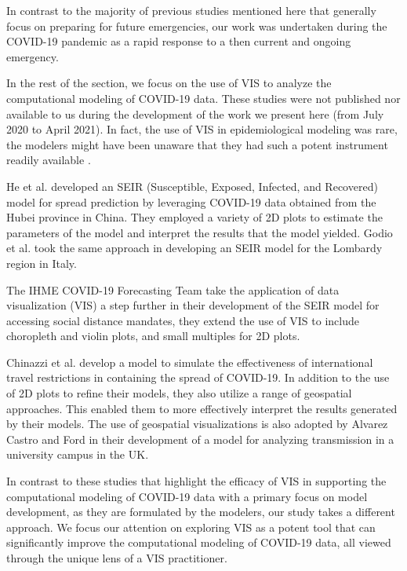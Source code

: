 In contrast to the majority of previous studies mentioned here that generally focus on preparing for future emergencies, our work was undertaken during the COVID-19 pandemic as a rapid response to a then current and ongoing emergency.

In the rest of the section, we focus on the use of \ac{VIS} to analyze the computational modeling of COVID-19 data.
These studies were not published nor available to us during the development of the work we present here (from July 2020 to April 2021).
In fact, the use of VIS in epidemiological modeling was rare, the modelers might have been unaware that they had such a potent instrument readily available \cite{chen2022RAMPVIS}.

He et al. \cite{he2020SEIR} developed an SEIR (Susceptible, Exposed, Infected, and Recovered) model for spread prediction by leveraging COVID-19 data obtained from the Hubei province in China.
They employed a variety of 2D plots to estimate the parameters of the model and interpret the results that the model yielded. Godio et al. \cite{godio2020SEIR} took the same approach in developing an SEIR model for the Lombardy region in Italy.

The IHME COVID-19 Forecasting Team \cite{ihmecovid-19forecastingteam2021Modeling} take the application of data visualization (VIS) a step further in their development of the SEIR model for accessing social distance mandates, they extend the use of \ac{VIS} to include choropleth and violin plots, and small multiples for 2D plots.

Chinazzi et al. \cite{chinazzi2020Effect} develop a model to simulate the effectiveness of international travel restrictions in containing the spread of COVID-19.
In addition to the use of 2D plots to refine their models, they also utilize a range of geospatial approaches.
This enabled them to more effectively interpret the results generated by their models.
The use of geospatial visualizations is also adopted by Alvarez Castro and Ford \cite{alvarezcastro20213D} in their development of a model for analyzing transmission in a university campus in the UK.

In contrast to these studies that highlight the efficacy of \ac{VIS} in supporting the computational modeling of COVID-19 data with a primary focus on model development, as they are formulated by the modelers, our study takes a different approach.
We focus our attention on exploring \ac{VIS} as a potent tool that can significantly improve the computational modeling of COVID-19 data, all viewed through the unique lens of a \ac{VIS} practitioner.
